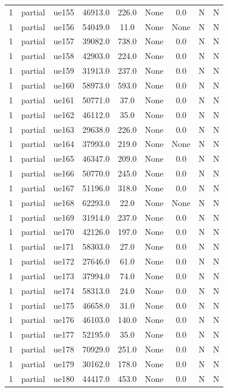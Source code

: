 \begin{table}[ht]
\begin{tabular}{|c|c|c|c|c|c|c|c|c|}
1 & partial & ue155 & 46913.0 & 226.0 & None & 0.0 & N & N \\
1 & partial & ue156 & 54049.0 & 11.0 & None & None & N & N \\
1 & partial & ue157 & 39082.0 & 738.0 & None & 0.0 & N & N \\
1 & partial & ue158 & 42903.0 & 224.0 & None & 0.0 & N & N \\
1 & partial & ue159 & 31913.0 & 237.0 & None & 0.0 & N & N \\
1 & partial & ue160 & 58973.0 & 593.0 & None & 0.0 & N & N \\
1 & partial & ue161 & 50771.0 & 37.0 & None & 0.0 & N & N \\
1 & partial & ue162 & 46112.0 & 35.0 & None & 0.0 & N & N \\
1 & partial & ue163 & 29638.0 & 226.0 & None & 0.0 & N & N \\
1 & partial & ue164 & 37993.0 & 219.0 & None & None & N & N \\
1 & partial & ue165 & 46347.0 & 209.0 & None & 0.0 & N & N \\
1 & partial & ue166 & 50770.0 & 245.0 & None & 0.0 & N & N \\
1 & partial & ue167 & 51196.0 & 318.0 & None & 0.0 & N & N \\
1 & partial & ue168 & 62293.0 & 22.0 & None & None & N & N \\
1 & partial & ue169 & 31914.0 & 237.0 & None & 0.0 & N & N \\
1 & partial & ue170 & 42126.0 & 197.0 & None & 0.0 & N & N \\
1 & partial & ue171 & 58303.0 & 27.0 & None & 0.0 & N & N \\
1 & partial & ue172 & 27646.0 & 61.0 & None & 0.0 & N & N \\
1 & partial & ue173 & 37994.0 & 74.0 & None & 0.0 & N & N \\
1 & partial & ue174 & 58313.0 & 24.0 & None & 0.0 & N & N \\
1 & partial & ue175 & 46658.0 & 31.0 & None & 0.0 & N & N \\
1 & partial & ue176 & 46103.0 & 140.0 & None & 0.0 & N & N \\
1 & partial & ue177 & 52195.0 & 35.0 & None & 0.0 & N & N \\
1 & partial & ue178 & 70929.0 & 251.0 & None & 0.0 & N & N \\
1 & partial & ue179 & 30162.0 & 178.0 & None & 0.0 & N & N \\
1 & partial & ue180 & 44417.0 & 453.0 & None & 0.0 & N & N \\

\end{tabular}
\end{table}
